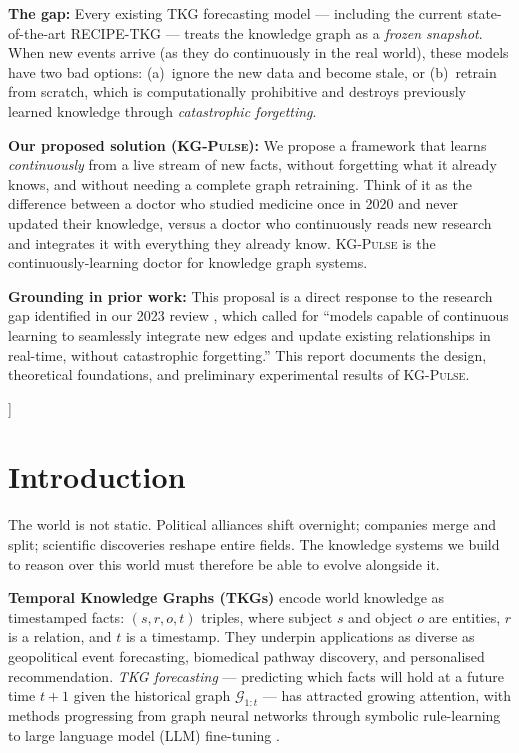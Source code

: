 \documentclass[10pt,a4paper,twocolumn]{article}
\theoremstyle{definition}
\newcommand{\ourmodel}{\textsc{KG-Pulse}}
\newcommand{\basemodel}{RECIPE-TKG}
\newcommand{\calG}{\mathcal{G}}
\begin{document}
{\begin{@twocolumnfalse}
\begin{center}
\begin{tcolorbox}
\textbf{The gap:} Every existing TKG forecasting model — including the
current state-of-the-art \basemodel{} \cite{Akgul2025recipe} — treats the
knowledge graph as a \emph{frozen snapshot}.
When new events arrive (as they do continuously in the real world), these
models have two bad options: (a)~ignore the new data and become stale, or
(b)~retrain from scratch, which is computationally prohibitive and destroys
previously learned knowledge through \emph{catastrophic forgetting}.

\textbf{Our proposed solution (\ourmodel{}):}
We propose a framework that learns \emph{continuously} from a live stream of
new facts, without forgetting what it already knows, and without needing a
complete graph retraining.
Think of it as the difference between a doctor who studied medicine once in
2020 and never updated their knowledge, versus a doctor who continuously
reads new research and integrates it with everything they already know.
\ourmodel{} is the continuously-learning doctor for knowledge graph systems.

\textbf{Grounding in prior work:}
This proposal is a direct response to the research gap identified in our
2023 review \cite{MacDube2023review}, which called for ``models capable of
continuous learning to seamlessly integrate new edges and update existing
relationships in real-time, without catastrophic forgetting.''
This report documents the design, theoretical foundations, and preliminary
experimental results of \ourmodel{}.
\end{tcolorbox}
\vspace{3pt}
\end{center}
\end{@twocolumnfalse}
}]

\section{Introduction}
\label{sec:intro}

The world is not static.
Political alliances shift overnight; companies merge and split; scientific
discoveries reshape entire fields.
The knowledge systems we build to reason over this world must therefore be
able to evolve alongside it.

\textbf{Temporal Knowledge Graphs (TKGs)} encode world knowledge as
timestamped facts: $(s, r, o, t)$ triples, where subject $s$ and object $o$
are entities, $r$ is a relation, and $t$ is a timestamp.
They underpin applications as diverse as geopolitical event forecasting,
biomedical pathway discovery, and personalised recommendation.
\emph{TKG forecasting} — predicting which facts will hold at a future
time $t+1$ given the historical graph $\calG_{1:t}$ — has attracted
growing attention, with methods progressing from graph neural networks
\cite{Li2021regcn,Han2020xerte} through symbolic rule-learning
\cite{Liu2022tlogic,Sun2021timetraveler} to large language model (LLM)
fine-tuning \cite{Liao2024gentkg,Akgul2025recipe}.
\end{document}
